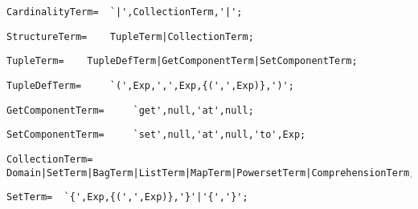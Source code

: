 \documentclass{article}
\begin{document}
    \begin{flushleft}
    \begin{lstlisting}[mathescape=true, breaklines=true]
      CardinalityTerm= 	`|',CollectionTerm,'|';
    \end{lstlisting}
    \end{flushleft}
    \begin{flushleft}
    \begin{lstlisting}[mathescape=true, breaklines=true]
      StructureTerm= 	TupleTerm|CollectionTerm;
    \end{lstlisting}
    \end{flushleft}
    \begin{flushleft}
    \begin{lstlisting}[mathescape=true, breaklines=true]
      TupleTerm= 	TupleDefTerm|GetComponentTerm|SetComponentTerm;
    \end{lstlisting}
    \end{flushleft}
    \begin{flushleft}
    \begin{lstlisting}[mathescape=true, breaklines=true]
      TupleDefTerm= 	`(',Exp,',',Exp,{(',',Exp)},')';
    \end{lstlisting}
    \end{flushleft}
    \begin{flushleft}
    \begin{lstlisting}[mathescape=true, breaklines=true]
      GetComponentTerm= 	`get',null,'at',null;
    \end{lstlisting}
    \end{flushleft}
    \begin{flushleft}
    \begin{lstlisting}[mathescape=true, breaklines=true]
      SetComponentTerm= 	`set',null,'at',null,'to',Exp;
    \end{lstlisting}
    \end{flushleft}
    \begin{flushleft}
    \begin{lstlisting}[mathescape=true, breaklines=true]
      CollectionTerm= 	Domain|SetTerm|BagTerm|ListTerm|MapTerm|PowersetTerm|ComprehensionTerm;
    \end{lstlisting}
    \end{flushleft}
    \begin{flushleft}
    \begin{lstlisting}[mathescape=true, breaklines=true]
      SetTerm= 	`{',Exp,{(',',Exp)},'}'|'{','}';
    \end{lstlisting}
    \end{flushleft}
\end{document}
